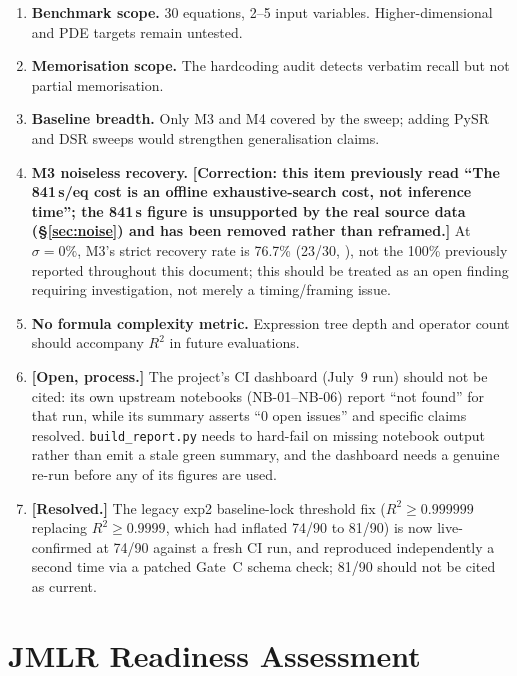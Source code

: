 \documentclass[twoside,11pt]{article}
\newcommand{\Rsq}{R^{2}}
\begin{document}
\begin{enumerate}
  \item \textbf{Benchmark scope.} 30 equations, 2--5 input variables.
    Higher-dimensional and PDE targets remain untested.
  \item \textbf{Memorisation scope.} The hardcoding audit detects verbatim
    recall but not partial memorisation.
  \item \textbf{Baseline breadth.} Only M3 and M4 covered by the sweep;
    adding PySR and DSR sweeps would strengthen generalisation claims.
  \item \textbf{M3 noiseless recovery.} \textbf{[Correction: this item
    previously read ``The 841\,s/eq cost is an offline exhaustive-search
    cost, not inference time''; the 841\,s figure is unsupported by the
    real source data (\S\ref{sec:noise}) and has been removed rather than
    reframed.]} At $\sigma=0\%$, M3's strict recovery rate is 76.7\%
    (23/30, ), not the 100\% previously reported
    throughout this document; this should be treated as an open finding
    requiring investigation, not merely a timing/framing issue.
  \item \textbf{No formula complexity metric.} Expression tree depth and
    operator count should accompany $\Rsq$ in future evaluations.
  \item \textbf{[Open, process.]} The project's CI dashboard (July~9 run)
    should not be cited: its own upstream notebooks (NB-01--NB-06) report
    ``not found'' for that run, while its summary asserts ``0 open
    issues'' and specific claims resolved. \texttt{build\_report.py}
    needs to hard-fail on missing notebook output rather than emit a
    stale green summary, and the dashboard needs a genuine re-run before
    any of its figures are used.
  \item \textbf{[Resolved.]} The legacy exp2 baseline-lock threshold
    fix ($R^2 \geq 0.999999$ replacing $R^2 \geq 0.9999$, which had
    inflated 74/90 to 81/90) is now live-confirmed at 74/90 against a
    fresh CI run, and reproduced independently a second time via a
    patched Gate~C schema check; 81/90 should not be cited as current.
\end{enumerate}

\section{JMLR Readiness Assessment}
\label{sec:jmlr}
\end{document}
